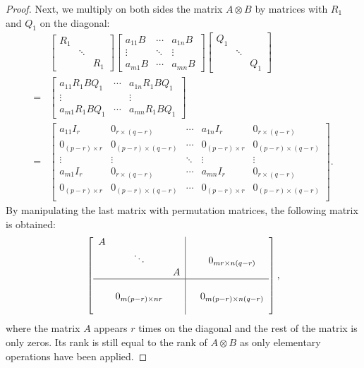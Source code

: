 \documentclass[11pt]{article}
\newcommand{\kp}{\otimes} %
\begin{document}
\begin{proof}
Next, we multiply on both sides the matrix $A\kp B$ by matrices with $R_1$ and $Q_1$ on the diagonal:
\begin{align*}
    &\begin{bmatrix}
    R_1 & &\\
    & \ddots & \\
    & & R_1
    \end{bmatrix}
    \begin{bmatrix}
    a_{11}B & \cdots & a_{1n}B\\
    \vdots & \ddots & \vdots\\
    a_{m1}B & \cdots & a_{mn}B
    \end{bmatrix}
    \begin{bmatrix}
    Q_1 & &\\
    & \ddots & \\
    & & Q_1
    \end{bmatrix}\\
    = &\begin{bmatrix}
    a_{11}R_1BQ_1 & \cdots & a_{1n}R_1BQ_1\\
    \vdots & & \vdots\\
    a_{m1}R_1BQ_1 & \cdots & a_{mn}R_1BQ_1
    \end{bmatrix}\\
    = &\begin{bmatrix}
    a_{11}I_r & 0_{r \times (q - r)} & \cdots & a_{1n}I_r & 0_{r \times (q-r)}\\
    0_{(p-r) \times r} & 0_{(p-r) \times (q-r)} & \cdots & 0_{(p-r) \times r} & 0_{(p-r) \times (q-r)}\\
    \vdots & \vdots & \ddots & \vdots & \vdots\\
    a_{m1}I_r & 0_{r \times (q - r)} & \cdots & a_{mn}I_r & 0_{r \times (q - r)}\\
    0_{(p-r) \times r} & 0_{(p-r) \times (q-r)}& \cdots & 0_{(p-r) \times r} & 0_{(p-r) \times (q-r)}\\
    \end{bmatrix}.
\end{align*}
By manipulating the last matrix with permutation matrices, the following matrix is obtained:
\[
    \begin{bmatrix}
    \begin{array}{c c c|c c c}
    A & & & & \\
    & \ddots & & & 0_{mr \times n(q-r)} \\
    & & A & &  \\
    \hline
    & & & & \\
    & 0_{m(p-r) \times nr} & & & 0_{m(p-r) \times n(q-r)} \\
    & & & & 
    \end{array}
    \end{bmatrix},
\]
where the matrix \(A\) appears \(r\) times on the diagonal and the rest of the matrix is only zeros. 
Its rank is still equal to the rank of $A\kp B$ as only elementary operations have been applied.


\end{proof}
\end{document}
